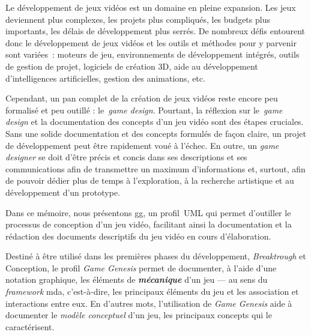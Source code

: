 \begin{introduction}



Le développement de jeux vidéos est un domaine en pleine expansion.
%
Les jeux deviennent plus complexes, les projets plus compliqués, les
budgets plus importants, les d\'elais de développement plus serr\'es.
%
De nombreux défis entourent donc le développement de jeux vidéos et
les outils et méthodes pour y parvenir sont variées~: moteurs de jeu,
environnements de développement intégrés, outils de gestion de projet,
logiciels de création 3D, aide au développement d'intelligences
artificielles, gestion des animations, etc.

Cependant, un pan complet de la création de jeux vidéos reste encore
peu formalisé et peu outillé : le~\emph{game design}.
%
Pourtant, la réflexion sur le~\emph{game design} et la documentation des concepts d'un jeu vidéo sont des étapes cruciales.
%
Sans une solide documentation et des concepts formul\'es de fa\c{c}on claire, un
projet de développement peut être rapidement voué à l'échec.
%
En outre, un \emph{game designer} se doit d'être précis et concis dans ses
descriptions et ses communications afin de transmettre un maximum
d'informations et, surtout, afin de pouvoir dédier plus de temps à l'exploration, à
la recherche artistique et au développement d'un prototype.


Dans ce mémoire, nous présentons \gls{gg}, un profil~UML qui permet d'outiller le processus de conception d'un jeu vidéo, facilitant ainsi la documentation et la rédaction des documents descriptifs du jeu vidéo en cours d'élaboration.

\begin{comment}
\gt{Ci-bas: il vaut mieux ne pas parler <<d'acc\'el\'eration>>, car tu
n'apportes aucune preuve/justification que cela permet d'aller plus
rapidement.}
\end{comment}


%
Destiné à être utilisé dans les premières phases du développement,
\emph{Breaktrough} et Conception, le profil \emph{Game Genesis}
permet de documenter, à l'aide d'une notation graphique, les
\'el\'ements de \emph{\bf mécanique} d'un jeu --- au sens du
\emph{framework} \gls{mda}, c'est-\`a-dire,
les principaux éléments du jeu et les association et interactions
entre eux.
%
En d'autres mots, l'utilisation de \emph{Game Genesis} aide \`a
documenter le \emph{mod\`ele conceptuel} d'un jeu, les principaux
concepts qui le caract\'erisent.



\end{introduction}

